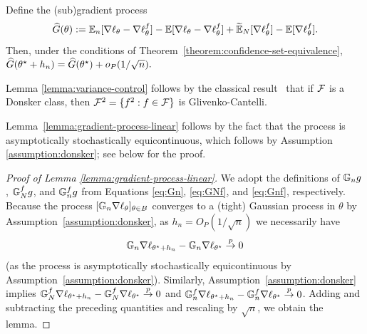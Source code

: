  
 

\begin{lemma}
    \label{lemma:gradient-process-linear}
   Define the (sub)gradient process
\begin{equation}
  \label{eqn:gradient-process}
\widehat G(\theta) := \mathbb{E}_n[\nabla \ell_{\theta}
  - \nabla \ell_{\theta}^f] - \mathbb{E}[\nabla \ell_{\theta}
  - \nabla \ell_{\theta}^f] + \widetilde {\mathbb{E}}_N[\nabla \ell_{\theta}^f] - \mathbb{E}[\nabla \ell_{\theta}^f].
 \end{equation}
Then, under the conditions of Theorem~\ref{theorem:confidence-set-equivalence}, $\widehat G(\theta^\star + h_n) = \widehat G(\theta^\star) + o_P(1/\sqrt{n}).$
\end{lemma}

Lemma \ref{lemma:variance-control} follows by the classical
  result~\cite[Lemma 2.10.14]{VanDerVaartWe96} that if $\mathcal{F}$ is a Donsker
  class, then $\mathcal{F}^2 = \{f^2 : f \in \mathcal{F}\}$ is Glivenko-Cantelli.
  
  Lemma~\ref{lemma:gradient-process-linear} follows by the fact that the process is asymptotically stochastically equicontinuous, which follows by Assumption \ref{assumption:donsker}; see below for the proof.
  
\begin{proof}[Proof of Lemma \ref{lemma:gradient-process-linear}]
We adopt the definitions of $\mathbb{G}_n g$, $\mathbb{G}_N^f g$, and $\mathbb{G}_n^f g$ from Equations \eqref{eq:Gn}, \eqref{eq:GNf}, and \eqref{eq:Gnf}, respectively.
    Because
    the process $[\mathbb{G}_n \nabla \ell_\theta]_{\theta \in B}$
    converges to a (tight) Gaussian process in $\theta$
    by Assumption~\ref{assumption:donsker},
    as $h_n = O_P(1/\sqrt{n})$ we necessarily have
    \begin{equation*}
      \mathbb{G}_n \nabla \ell_{\theta^\star + h_n}
      - \mathbb{G}_n\nabla \ell_{\theta^\star}
      \stackrel{p}{\rightarrow} 0
    \end{equation*}
    (as the process is asymptotically stochastically equicontinuous
    by Assumption~\ref{assumption:donsker}). Similarly,
    Assumption~\ref{assumption:donsker} implies $\mathbb{G}_N^f \nabla \ell_{\theta^\star + h_n}
      - \mathbb{G}_N^f\nabla \ell_{\theta^\star} \stackrel{p}{\rightarrow} 0$ and $\mathbb{G}_n^f \nabla \ell_{\theta^\star + h_n}
      - \mathbb{G}_n^f\nabla \ell_{\theta^\star} \stackrel{p}{\rightarrow} 0$.
    Adding and subtracting the preceding quantities and rescaling by $\sqrt{n}$,
    we obtain the lemma.
\end{proof}  
  
  
  
